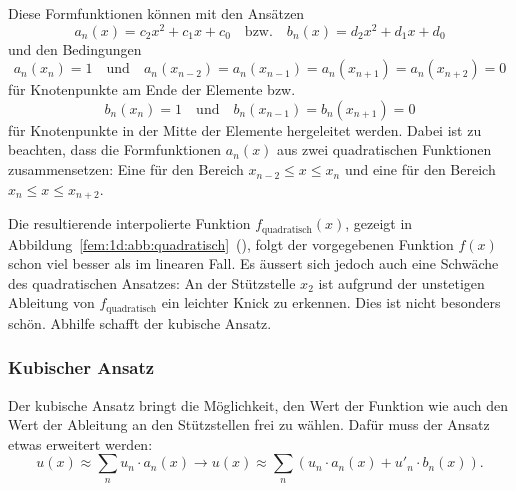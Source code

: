 Diese Formfunktionen können mit den Ansätzen 
\begin{equation}
    a_n(x) = c_2x^2 + c_1x + c_0
    \quad \text{bzw.} \quad
    b_n(x) = d_2x^2 + d_1x + d_0
\end{equation}
und den Bedingungen 
\begin{equation}
    a_n(x_n) = 1 
    \quad \text{und} \quad 
    a_n(x_{n-2}) = a_n(x_{n-1}) = a_n(x_{n+1}) = a_n(x_{n+2}) = 0
\end{equation}
für Knotenpunkte am Ende der Elemente bzw.
\begin{equation}
    b_n(x_n) = 1
    \quad \text{und} \quad 
    b_n(x_{n-1}) = b_n(x_{n+1}) = 0
\end{equation}
für Knotenpunkte in der Mitte der Elemente hergeleitet werden.
Dabei ist zu beachten, dass die Formfunktionen $a_n(x)$ aus zwei quadratischen Funktionen zusammensetzen: 
Eine für den Bereich $x_{n-2} \leq x \leq x_n$ und eine für den Bereich $x_n \leq x \leq x_{n+2}$.

Die resultierende interpolierte Funktion $f_\text{quadratisch} (x)$, gezeigt in Abbildung~\ref{fem:1d:abb:quadratisch}~(), folgt der vorgegebenen Funktion $f(x)$ schon viel besser als im linearen Fall.
Es äussert sich jedoch auch eine Schwäche des quadratischen Ansatzes: 
An der Stützstelle $x_2$ ist aufgrund der unstetigen Ableitung von $f_\text{quadratisch}$ ein leichter Knick zu erkennen.
Dies ist nicht besonders schön.
Abhilfe schafft der kubische Ansatz.

\subsubsection{Kubischer Ansatz}

Der kubische Ansatz bringt die Möglichkeit, den Wert der Funktion wie auch den Wert der Ableitung an den Stützstellen frei zu wählen.
Dafür muss der Ansatz etwas erweitert werden:
\begin{equation}
    u(x) \approx \sum_{n}{u_n \cdot a_n(x)} \rightarrow u(x) \approx \sum_{n}{\left(u_n \cdot a_n(x) + u'_n \cdot b_n(x)\right)}.
\end{equation}

